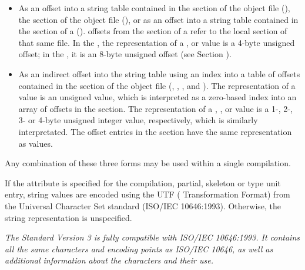 \begin{itemize}
\begin{itemize}
\item As an 
offset into a string table contained in
the \dotdebugstr{} section of the object file (\DWFORMstrpTARG), 
the \dotdebuglinestr{} section of the object file (\DWFORMlinestrpTARG),
or as an offset into a string table contained in the
\dotdebugstr{} section of a  
(\DWFORMstrpsupTARG).  \DWFORMstrpsupNAME{} offsets from the \dotdebuginfo{}  
section of a 
refer to the local \dotdebugstr{} section of that same file.
In the \thirtytwobitdwarfformat, the representation of a 
\DWFORMstrpNAME{}, 
\bb
\DWFORMlinestrpNAME{} 
\eb
or \DWFORMstrpsupNAME{}
value is a 4-byte unsigned offset; in the \sixtyfourbitdwarfformat,
it is an 8-byte unsigned offset 
(see Section ).

\item As an indirect offset into the string table using an 
index into a table of offsets contained in the 
\dotdebugstroffsets{} section of the object file 
\bb
(\DWFORMstrxTARG, \DWFORMstrxoneTARG, \DWFORMstrxtwoTARG, \DWFORMstrxthreeTARG{} and \DWFORMstrxfourTARG).
\eb
The representation of a \DWFORMstrxNAME{} value is an unsigned 
 value, which is interpreted as a zero-based 
index into an array of offsets in the \dotdebugstroffsets{} section.
\bb
The representation of a \DWFORMstrxoneNAME, \DWFORMstrxtwoNAME, 
\DWFORMstrxthreeNAME{} or \DWFORMstrxfourNAME{} value is a 
1-, 2-, 3- or 4-byte unsigned integer value, respectively,
which is similarly interpretated.
\eb 
The offset entries in the \dotdebugstroffsets{} section have the 
same representation as \DWFORMstrp{} values.
\end{itemize}
Any combination of these three forms may be used within a single compilation.

If the \DWATuseUTFeight{}
 attribute is specified for the
compilation, partial, skeleton or type unit entry, string values are encoded using the
UTF ( Transformation Format) from the Universal
Character Set standard (ISO/IEC 10646:1993).
Otherwise, the string representation is unspecified.

\textit{The  Standard Version 3 is fully compatible with
ISO/IEC 10646:1993. 
It contains all the same characters
and encoding points as ISO/IEC 10646, as well as additional
information about the characters and their use.}


\end{itemize}
